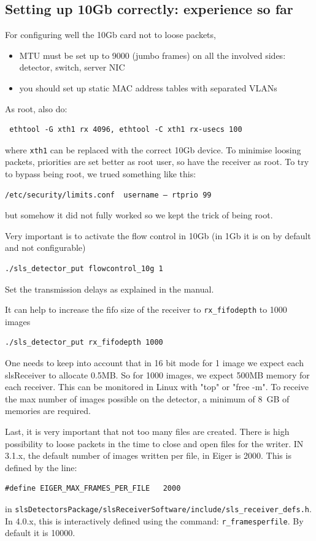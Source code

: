 \documentclass{article}
\begin{document}
\begin{itemize}
\end{itemize}
\subsection{Setting up 10Gb correctly: experience so far}\label{10g}

For configuring well the 10Gb card not to loose packets, 
\begin{itemize}
\item MTU must be set up to 9000 (jumbo frames) on all the involved sides: detector, switch, server NIC
\item you should set up static MAC address tables with separated VLANs
\end{itemize}
As root, also do:
\begin{verbatim}
 ethtool -G xth1 rx 4096, ethtool -C xth1 rx-usecs 100 
\end{verbatim}
where {\tt{xth1}} can be replaced with the correct 10Gb device. To minimise loosing packets, priorities are set better as root user, so have the receiver as root.
To try to bypass being root, we trued something like this:
\begin{verbatim}
/etc/security/limits.conf  username – rtprio 99
\end{verbatim}
but somehow it did  not fully worked  so we kept the trick of being root.

Very important is to activate the flow control in 10Gb (in 1Gb it is on by default and not configurable)
\begin{verbatim}
./sls_detector_put flowcontrol_10g 1
\end{verbatim}
Set the transmission delays as explained in the manual.

It can help to increase the fifo size of the receiver to {\tt{rx\_fifodepth}} to 1000 images
\begin{verbatim}
./sls_detector_put rx_fifodepth 1000
\end{verbatim}
One needs to keep into account that in 16 bit mode for 1 image we expect each slsReceiver  to allocate 0.5MB. So for 1000 images, we expect  500MB memory for each receiver. This can be monitored in Linux with "top" or "free -m". To receive the max number of images possible on the detector, a minimum of 8~GB of memories are required.

Last, it is very important that not too many files are created. There is high possibility to loose packets in the time to close and open files for the writer. IN 3.1.x, the default number of images written per file, in Eiger is 2000. This is defined by the line:
\begin{verbatim}
#define EIGER_MAX_FRAMES_PER_FILE	2000
\end{verbatim}
in {\tt{slsDetectorsPackage/slsReceiverSoftware/include/sls\_receiver\_defs.h}}. In 4.0.x, this is interactively defined using the command: {\tt{r\_framesperfile}}. By default it is 10000.  
\end{document}
